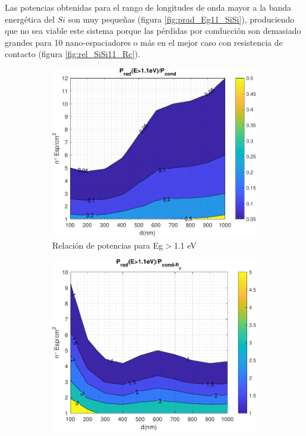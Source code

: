 Las potencias obtenidas para el rango de longitudes de onda mayor a la banda energética del $Si$ son muy pequeñas (figura \ref{fig:prad_Eg11_SiSi}), produciendo que no sea viable este sistema porque las pérdidas por conducción son demasiado grandes para 10 nano-espaciadores o más en el mejor caso con resistencia de contacto (figura \ref{fig:rel_SiSi11_Rc}).
\begin{figure}[H]
	\centering
\begin{subfigure}[b]{0.49\textwidth}
	\centering
		\includegraphics[width=1.00\textwidth]{figuras/Resultados/RelacionCondRad/rel_SiSi11.pdf}
	\caption{Relación de potencias para Eg$>$1.1 eV}
	\label{fig:rel_SiSi11}
\end{subfigure}
\hfill
\begin{subfigure}[b]{0.49\textwidth}
	\centering
		\includegraphics[width=1.00\textwidth]{figuras/Resultados/RelacionCondRad/rel_SiSi11_Rc.pdf}

\end{subfigure}
\end{figure}
